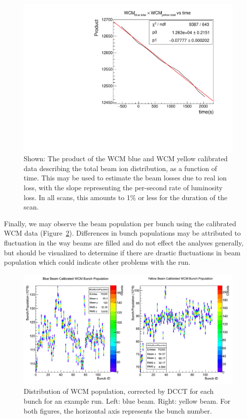 \begin{figure}
  \centering
  \includegraphics[width=\linewidth]{./figures/wcm_rate_loss.pdf}
  \caption{
    Shown: The product of the WCM blue and WCM yellow calibrated data describing
    the total beam ion distribution, as a function of time. This may be used to
    estimate the beam losses due to real ion loss, with the slope representing
    the per-second rate of luminosity loss. In all scans, this amounts to 1\% or
    less for the duration of the scan.
  }
  \label{fig:wcm_rate_loss}
\end{figure}

Finally, we may observe the beam population per bunch using the calibrated WCM
data (Figure~\ref{fig:bunch_population_example}). Differences in bunch
populations may be attributed to fluctuation in the way beams are filled and do
not effect the analyses generally, but should be visualized to determine if
there are drastic fluctuations in beam population which could indicate other
problems with the run.

\begin{figure}
  \centering
  \includegraphics[width=\linewidth]{./figures/359711_bunch_population.png}
  \caption{
    Distribution of WCM population, corrected by DCCT for each bunch for an
    example run. Left: blue beam. Right: yellow beam. For both figures, the
    horizontal axis represents the bunch number.
  }
  \label{fig:bunch_population_example}
\end{figure}

